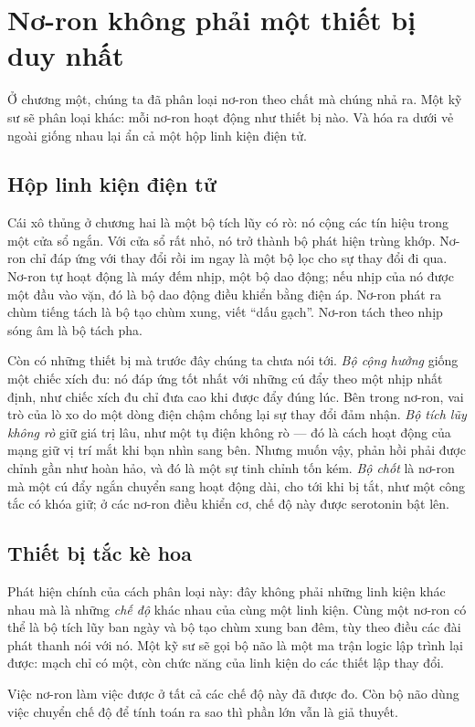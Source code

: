 \chapter{Nơ-ron không phải một thiết bị duy nhất}

Ở chương một, chúng ta đã phân loại nơ-ron theo chất mà chúng nhả ra. Một kỹ sư sẽ phân loại khác: mỗi nơ-ron hoạt động như thiết bị nào. Và hóa ra dưới vẻ ngoài giống nhau lại ẩn cả một hộp linh kiện điện tử.

\section*{Hộp linh kiện điện tử}

Cái xô thủng ở chương hai là một bộ tích lũy có rò: nó cộng các tín hiệu trong một cửa sổ ngắn. Với cửa sổ rất nhỏ, nó trở thành bộ phát hiện trùng khớp. Nơ-ron chỉ đáp ứng với thay đổi rồi im ngay là một bộ lọc cho sự thay đổi đi qua. Nơ-ron tự hoạt động là máy đếm nhịp, một bộ dao động; nếu nhịp của nó được một đầu vào vặn, đó là bộ dao động điều khiển bằng điện áp. Nơ-ron phát ra chùm tiếng tách là bộ tạo chùm xung, viết ``dấu gạch''. Nơ-ron tách theo nhịp sóng âm là bộ tách pha.


Còn có những thiết bị mà trước đây chúng ta chưa nói tới. \emph{Bộ cộng hưởng} giống một chiếc xích đu: nó đáp ứng tốt nhất với những cú đẩy theo một nhịp nhất định, như chiếc xích đu chỉ đưa cao khi được đẩy đúng lúc. Bên trong nơ-ron, vai trò của lò xo do một dòng điện chậm chống lại sự thay đổi đảm nhận. \emph{Bộ tích lũy không rò} giữ giá trị lâu, như một tụ điện không rò --- đó là cách hoạt động của mạng giữ vị trí mắt khi bạn nhìn sang bên. Nhưng muốn vậy, phản hồi phải được chỉnh gần như hoàn hảo, và đó là một sự tinh chỉnh tốn kém. \emph{Bộ chốt} là nơ-ron mà một cú đẩy ngắn chuyển sang hoạt động dài, cho tới khi bị tắt, như một công tắc có khóa giữ; ở các nơ-ron điều khiển cơ, chế độ này được serotonin bật lên.

\section*{Thiết bị tắc kè hoa}

Phát hiện chính của cách phân loại này: đây không phải những linh kiện khác nhau mà là những \emph{chế độ} khác nhau của cùng một linh kiện. Cùng một nơ-ron có thể là bộ tích lũy ban ngày và bộ tạo chùm xung ban đêm, tùy theo điều các đài phát thanh nói với nó. Một kỹ sư sẽ gọi bộ não là một ma trận logic lập trình lại được: mạch chỉ có một, còn chức năng của linh kiện do các thiết lập thay đổi.

Việc nơ-ron làm việc được ở tất cả các chế độ này đã được đo. Còn bộ não dùng việc chuyển chế độ để tính toán ra sao thì phần lớn vẫn là giả thuyết.

